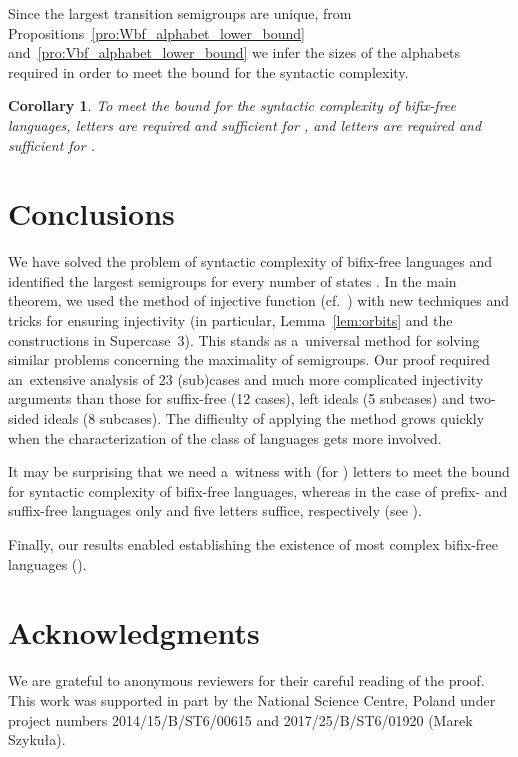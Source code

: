 \documentclass{amsart}
\newtheorem{corollary}[theorem]{Corollary}
\begin{document}
Since the largest transition semigroups are unique, from Propositions~\ref{pro:Wbf_alphabet_lower_bound} and~\ref{pro:Vbf_alphabet_lower_bound} we infer the sizes of the alphabets required in order to meet the bound for the syntactic complexity.
\begin{corollary}
To meet the bound for the syntactic complexity of bifix-free languages,  letters are required and sufficient for , and  letters are required and sufficient for .
\end{corollary}



\section{Conclusions}

We have solved the problem of syntactic complexity of bifix-free languages and identified the largest semigroups for every number of states .
In the main theorem, we used the method of injective function (cf.~\cite{BrSz14a,BrSz15SyntacticComplexityOfSuffixFree}) with new techniques and tricks for ensuring injectivity (in particular, Lemma~\ref{lem:orbits} and the constructions in Supercase~3). This stands as a~universal method for solving similar problems concerning the maximality of semigroups.
Our proof required an~extensive analysis of 23 (sub)cases and much more complicated injectivity arguments than those for suffix-free (12 cases), left ideals (5 subcases) and two-sided ideals (8 subcases).
The difficulty of applying the method grows quickly when the characterization of the class of languages gets more involved.

It may be surprising that we need a~witness with  (for ) letters to meet the bound for syntactic complexity of bifix-free languages, whereas in the case of prefix- and suffix-free languages only  and five letters suffice, respectively (see \cite{BLY12,BrSz15SyntacticComplexityOfSuffixFree}).

Finally, our results enabled establishing the existence of most complex bifix-free languages (\cite{FeSz17ComplexityOfBifixFree,FeSz18ComplexityOfBifixFree}).

\section*{Acknowledgments}

We are grateful to anonymous reviewers for their careful reading of the proof.
This work was supported in part by the National Science Centre, Poland under project numbers 2014/15/B/ST6/00615 and 2017/25/B/ST6/01920 (Marek Szyku{\l}a).
\end{document}

